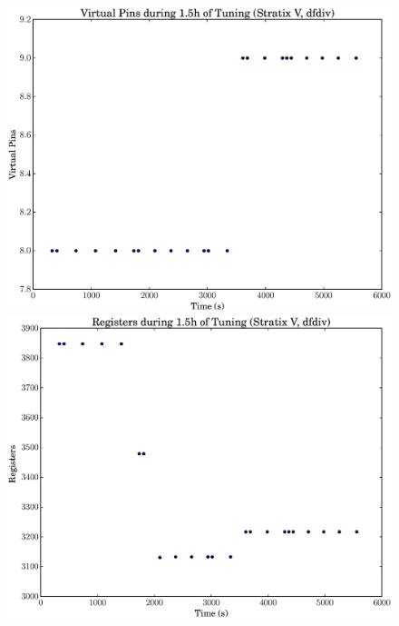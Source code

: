\documentclass[12pt, a4paper]{article}
\begin{document}
\begin{figure}[htpb]
    \begin{minipage}{.48\textwidth}
        \includegraphics[scale=.25]{dfdiv_pins_5400_chstone_StratixV}
    \end{minipage}%
    \hfill
    \begin{minipage}{.48\textwidth}
        \includegraphics[scale=.25]{dfdiv_regs_5400_chstone_StratixV}
    \end{minipage}%


\end{figure}
\end{document}
